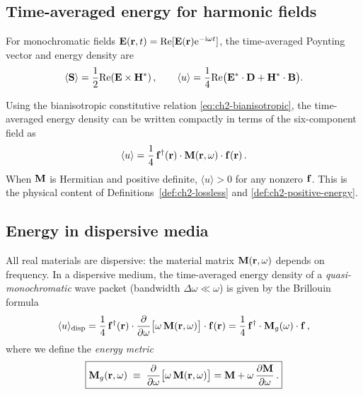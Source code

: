 \subsection{Time-averaged energy for harmonic fields}
\label{sec:ch2-energy-harmonic}

For monochromatic fields
$\mathbf{E}(\mathbf{r},t)=\mathrm{Re}[\mathbf{E}(\mathbf{r})\mathrm{e}^{-\mathrm{i}\omega t}]$, the
time-averaged Poynting vector and energy density are
\begin{equation}\label{eq:ch2-time-avg}
  \langle\mathbf{S}\rangle
  = \frac{1}{2}\mathrm{Re}(\mathbf{E}\times\mathbf{H}^*)\,,
  \qquad
  \langle u\rangle
  = \frac{1}{4}\mathrm{Re}\bigl(
    \mathbf{E}^*\cdot\mathbf{D} + \mathbf{H}^*\cdot\mathbf{B}
  \bigr).
\end{equation}

Using the bianisotropic constitutive relation \eqref{eq:ch2-bianisotropic},
the time-averaged energy density can be written compactly in terms of
the six-component field as
\begin{equation}\label{eq:ch2-energy-sixfield}
  \langle u\rangle
  = \frac{1}{4}\,\mathbf{f}^\dagger(\mathbf{r})\cdot\mathbf{M}(\mathbf{r},\omega)
    \cdot\mathbf{f}(\mathbf{r})\,.
\end{equation}
When $\mathbf{M}$ is Hermitian and positive definite, $\langle u\rangle>0$
for any nonzero $\mathbf{f}$.  This is the physical content of
Definitions~\ref{def:ch2-lossless} and \ref{def:ch2-positive-energy}.

\subsection{Energy in dispersive media}
\label{sec:ch2-dispersive-energy}

All real materials are dispersive: the material matrix
$\mathbf{M}(\mathbf{r},\omega)$ depends on frequency.  In a dispersive
medium, the time-averaged energy density of a \emph{quasi-monochromatic}
wave packet (bandwidth $\Delta\omega\ll\omega$) is given by the
Brillouin formula
\begin{equation}\label{eq:ch2-brillouin-energy}
  \langle u\rangle_{\mathrm{disp}}
  = \frac{1}{4}\,\mathbf{f}^\dagger(\mathbf{r})\cdot
  \frac{\partial }{\partial \omega}\bigl[\omega\,\mathbf{M}(\mathbf{r},\omega)\bigr]
  \cdot\mathbf{f}(\mathbf{r})
  = \frac{1}{4}\,\mathbf{f}^\dagger\cdot\mathbf{M}_g(\omega)\cdot\mathbf{f}\,,
\end{equation}
where we define the \emph{energy metric}
\begin{equation}\label{eq:ch2-energy-metric}
  \boxed{%
  \Mgmat(\rvec,\omega)
  \;\equiv\;
  \pderiv{}{\omega}\bigl[\omega\,\Mmat(\rvec,\omega)\bigr]
  = \Mmat + \omega\,\pderiv{\Mmat}{\omega}\,.}
\end{equation}

